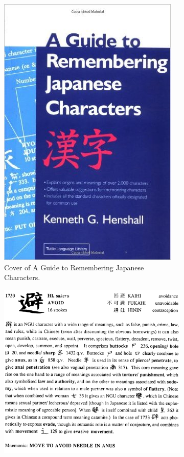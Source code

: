 \begin{figure}[ht]
    \begin{subfigure}{0.5\textwidth}
    \includegraphics[width=0.9\linewidth]{Cap1/AGuideJapaneseCover}
    \caption{Cover of A Guide to Remembering Japanese Characters.}
    \label{fig:henshallbookcover}
    \end{subfigure}
    \begin{subfigure}{0.5\textwidth}
    \includegraphics[width=0.9\linewidth]{Cap1/AGuideJapanese}

\end{subfigure}
\end{figure}
